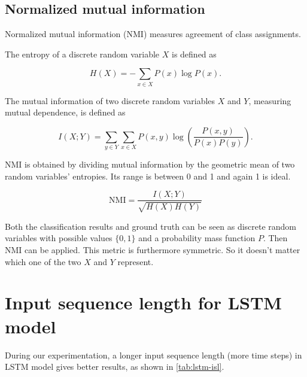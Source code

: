 \documentclass[11pt,a4paper]{report}
\begin{document}
\subsection{Normalized mutual information}

Normalized mutual information (NMI) measures agreement of class assignments.

The entropy of a discrete random variable \(X\) is defined as

\begin{equation*}
  H(X) = - \sum_{x \in X} P(x) \log P(x).
\end{equation*}

The mutual information of two discrete random variables \(X\) and \(Y\), measuring mutual dependence, is defined as

\begin{equation*}
  I(X;Y) = \sum_{y \in Y} \sum_{x \in X} P(x,y) \log \left(\frac{P(x,y)}{P(x)P(y)}\right).
\end{equation*}

NMI is obtained by dividing mutual information by the geometric mean of two random variables' entropies.
Its range is between 0 and 1 and again 1 is ideal.

\begin{equation*}
  \mathrm{NMI} = \frac{I(X;Y)}{\sqrt{H(X)H(Y)}}
\end{equation*}

Both the classification results and ground truth can be seen as discrete random variables with possible values \(\lbrace 0,1 \rbrace\) and a probability mass function \(P\).
Then NMI can be applied.
This metric is furthermore symmetric.
So it doesn't matter which one of the two \(X\) and \(Y\) represent.

\section{Input sequence length for LSTM model}

During our experimentation, a longer input sequence length (more time steps) in LSTM model gives better results, as shown in \autoref{tab:lstm-isl}.
\end{document}

